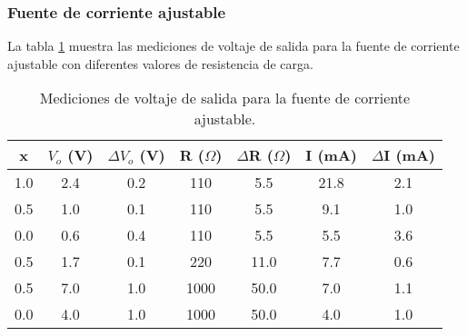 \FloatBarrier
\subsubsection{Fuente de corriente ajustable}

La tabla \ref{tab:mediciones-fuente-corriente-ajustable} muestra las mediciones de voltaje de salida para la fuente de corriente ajustable con diferentes valores de resistencia de carga.

\begin{table}[ht]
    \centering
    \begin{tabular}{|c|c|c|c|c|c|c|}
        \hline
        x & $V_o$ (V) & $\Delta V_o$ (V) & R ($\Omega$) & $\Delta$R ($\Omega$) & I (mA) & $\Delta$I (mA) \\
        \hline
        1.0 & 2.4 & 0.2 & 110 & 5.5 & 21.8 & 2.1 \\
        0.5 & 1.0 & 0.1 & 110 & 5.5 & 9.1 & 1.0 \\
        0.0 & 0.6 & 0.4 & 110 & 5.5 & 5.5 & 3.6 \\
        0.5 & 1.7 & 0.1 & 220 & 11.0 & 7.7 & 0.6 \\
        0.5 & 7.0 & 1.0 & 1000 & 50.0 & 7.0 & 1.1 \\
        0.0 & 4.0 & 1.0 & 1000 & 50.0 & 4.0 & 1.0 \\
        \hline
    \end{tabular}
    \caption{Mediciones de voltaje de salida para la fuente de corriente ajustable.}
    \label{tab:mediciones-fuente-corriente-ajustable}
\end{table}






